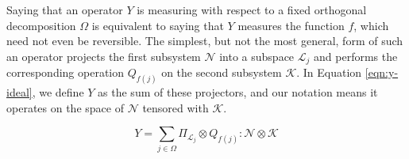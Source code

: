 Saying that an operator $Y$ is measuring with respect to a fixed
orthogonal decomposition $\Omega$ is equivalent to saying that
$Y$ measures the function $f$, which need not even be reversible.
The simplest, but not the most general, form of such an operator projects
the first subsystem $\mathcal{N}$ into a subspace $\mathcal{L}_j$
and performs the
corresponding operation $Q_{f(j)}$ on the second subsystem $\mathcal{K}$.
In Equation \ref{eqn:y-ideal}, we define $Y$ as the sum of these projectors,
and our notation means it operates on the space of $\mathcal{N}$
tensored with $\mathcal{K}$.

\begin{equation}
Y = \sum_{j \in \Omega} \Pi_{\mathcal{L}_j} \otimes Q_{f(j)} : \mathcal{N} \otimes \mathcal{K}
\label{eqn:y-ideal}
\end{equation}
